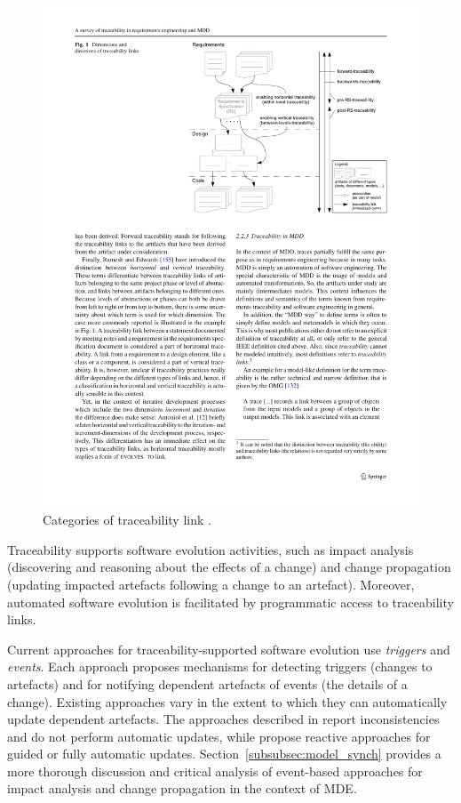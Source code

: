 \begin{figure}[htbp]
  \begin{center}
    \leavevmode
    \includegraphics[width=11.5cm]{3.LiteratureReview/images/traceability_links.pdf}
  \end{center}
  \caption[Categories of traceability link]{Categories of traceability link \cite{winkler09survey}.}
  \label{fig:traceability_links}
\end{figure}

Traceability supports software evolution activities, such as impact analysis (discovering and reasoning about the effects of a change) and change propagation (updating impacted artefacts following a change to an artefact). Moreover, automated software evolution is facilitated by programmatic access to traceability links.

Current approaches for traceability-supported software evolution use \emph{triggers} and \emph{events}. Each approach proposes mechanisms for detecting triggers (changes to artefacts) and for notifying dependent artefacts of events (the details of a change). Existing approaches vary in the extent to which they can automatically update dependent artefacts. The approaches described in \cite{chen99consistency,cleland03eventbased} report inconsistencies and do not perform automatic updates, while \cite{aizenbud05operational,costa2007rtmdd} propose reactive approaches for guided or fully automatic updates. Section~\ref{subsubsec:model_synch} provides a more thorough discussion and critical analysis of event-based approaches for impact analysis and change propagation in the context of MDE.

